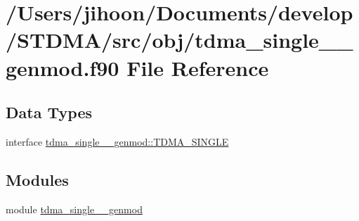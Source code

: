 \hypertarget{tdma__single____genmod_8f90}{}\section{/\+Users/jihoon/\+Documents/develop/\+S\+T\+D\+M\+A/src/obj/tdma\+\_\+single\+\_\+\+\_\+genmod.f90 File Reference}
\label{tdma__single____genmod_8f90}
\subsection*{Data Types}
\begin{DoxyCompactItemize}
\item 
interface \mbox{\hyperlink{interfacetdma__single____genmod_1_1_t_d_m_a___s_i_n_g_l_e}{tdma\+\_\+single\+\_\+\+\_\+genmod\+::\+T\+D\+M\+A\+\_\+\+S\+I\+N\+G\+LE}}
\end{DoxyCompactItemize}
\subsection*{Modules}
\begin{DoxyCompactItemize}
\item 
module \mbox{\hyperlink{namespacetdma__single____genmod}{tdma\+\_\+single\+\_\+\+\_\+genmod}}
\end{DoxyCompactItemize}
